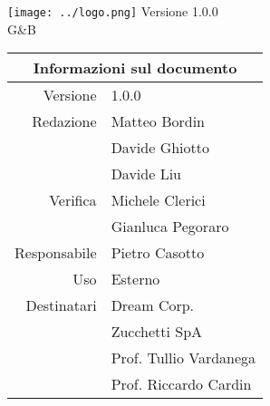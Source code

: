 \maketitle
	\begin{center}
	\hspace{5em}
	   \texttt{[image: ../logo.png]}\newline
	\huge Versione 1.0.0 
	\\G\&B
	
	\begin{table}[h!]
		\centering
		\begin{tabular}{r|l}
			\multicolumn{2}{c}{Informazioni sul documento}\\
			\hline
			Versione & 1.0.0 \\
			Redazione & Matteo Bordin\\
			& Davide Ghiotto\\
			& Davide Liu\\
			Verifica & Michele Clerici\\
			& Gianluca Pegoraro\\
			Responsabile & Pietro Casotto\\
			Uso & Esterno\\
			Destinatari & Dream Corp. \\
			& Zucchetti SpA\\
			& Prof. Tullio Vardanega\\
			& Prof. Riccardo Cardin\\
		\end{tabular}
	\end{table}
	
	\end{center}
	\newpage
